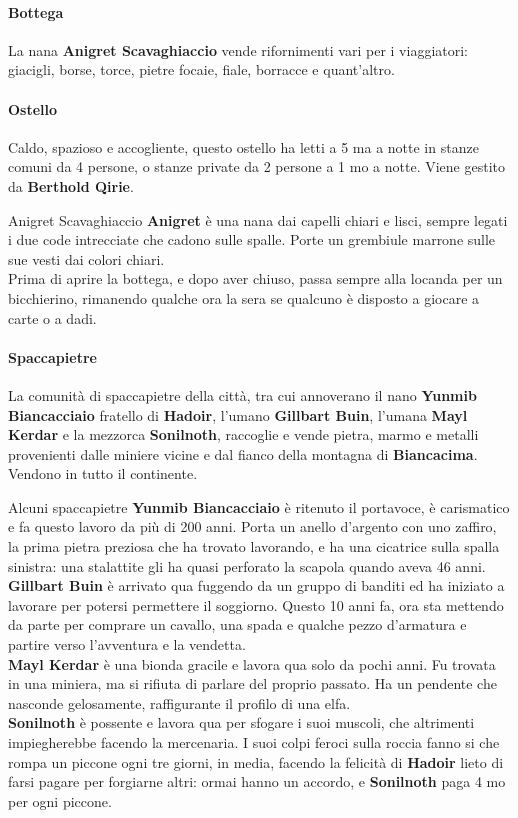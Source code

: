 \documentclass[10pt,twoside,onecolumn,openany]{book}
\begin{document}
\begin{multicols}{2}
\paragraph{Bottega}
La nana \textbf{Anigret Scavaghiaccio} vende rifornimenti vari per i viaggiatori: giacigli, borse, torce, pietre focaie, fiale, borracce e quant'altro.
\paragraph{Ostello}
Caldo, spazioso e accogliente, questo ostello ha letti a 5 ma a notte in stanze comuni da 4 persone, o stanze private da 2 persone a 1 mo a notte. Viene gestito da \textbf{Berthold Qirie}.
\begin{paperbox}{{Anigret Scavaghiaccio}}
\textbf{Anigret} è una nana dai capelli chiari e lisci, sempre legati i due code intrecciate che cadono sulle spalle. Porte un grembiule marrone sulle sue vesti dai colori chiari.\\
Prima di aprire la bottega, e dopo aver chiuso, passa sempre alla locanda per un bicchierino, rimanendo qualche ora la sera se qualcuno è disposto a giocare a carte o a dadi.
\end{paperbox}
\end{multicols}
\paragraph{Spaccapietre} La comunità di spaccapietre della città, tra cui annoverano il nano \textbf{Yunmib Biancacciaio} fratello di \textbf{Hadoir}, l'umano \textbf{Gillbart Buin}, l'umana \textbf{Mayl Kerdar} e la mezzorca \textbf{Sonilnoth}, raccoglie e vende pietra, marmo e metalli provenienti dalle miniere vicine e dal fianco della montagna di \textbf{Biancacima}. Vendono in tutto il continente.
\begin{paperbox}{{Alcuni spaccapietre}}
\textbf{Yunmib Biancacciaio} è ritenuto il portavoce, è carismatico e fa questo lavoro da più di 200 anni. Porta un anello d'argento con uno zaffiro, la prima pietra preziosa che ha trovato lavorando, e ha una cicatrice sulla spalla sinistra: una stalattite gli ha quasi perforato la scapola quando aveva 46 anni.\\
\textbf{Gillbart Buin} è arrivato qua fuggendo da un gruppo di banditi ed ha iniziato a lavorare per potersi permettere il soggiorno. Questo 10 anni fa, ora sta mettendo da parte per comprare un cavallo, una spada e qualche pezzo d'armatura e partire verso l'avventura e la vendetta.\\
\textbf{Mayl Kerdar} è una bionda gracile e lavora qua solo da pochi anni. Fu trovata in una miniera, ma si rifiuta di parlare del proprio passato. Ha un pendente che nasconde gelosamente, raffigurante il profilo di una elfa.\\
\textbf{Sonilnoth} è possente e lavora qua per sfogare i suoi muscoli, che altrimenti impiegherebbe facendo la mercenaria. I suoi colpi feroci sulla roccia fanno si che rompa un piccone ogni tre giorni, in media, facendo la felicità di \textbf{Hadoir} lieto di farsi pagare per forgiarne altri: ormai hanno un accordo, e \textbf{Sonilnoth} paga 4 mo per ogni piccone.
\end{paperbox}
\newpage
\end{document}
